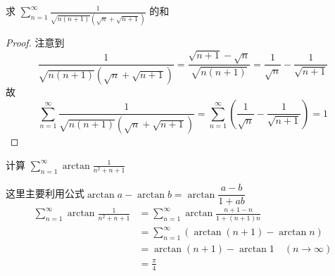 \documentclass[color=green,titlestyle=hang]{elegantbook}%
\begin{document}
\begin{example}
求 $\sum_{n=1}^{\infty}\frac{1}{\sqrt{n(n+1)}(\sqrt{n}+\sqrt{n+1})}$ 的和	
\end{example}\begin{proof}
注意到
\[\frac{1}{\sqrt{n(n+1)} (\sqrt{n} + \sqrt{n+1})} = \frac{\sqrt{n+1} -\sqrt{n}}{\sqrt{n(n+1)}} = \frac1{\sqrt{n}} - \frac1{\sqrt{n+1}}\]
故\[\sum_{n=1}^{\infty}\frac{1}{\sqrt{n(n+1)} (\sqrt{n} + \sqrt{n+1})} 
=  \sum_{n=1}^{\infty}\left(\frac1{\sqrt{n}} - \frac1{\sqrt{n+1}}\right)=1\]
\end{proof}

\begin{example}
计算 $\displaystyle \sum_{n=1}^\infty \arctan\frac{1}{n^2+n+1}$	
\end{example}\begin{solution}
这里主要利用公式$\arctan a-\arctan b=\arctan\dfrac{a-b}{1+ab}$
\begin{align*}
\sum_{n=1}^\infty \arctan\frac{1}{n^2+n+1}&=\sum_{n=1}^\infty \arctan\frac{n+1-n}{1+(n+1)n}\\
&=\sum_{n=1}^\infty (\arctan(n+1)-\arctan n)\\
&=\arctan(n+1)-\arctan 1\quad(n\to \infty)\\
&=\frac{\pi}{4}
\end{align*}	
\end{solution}
\end{document}
